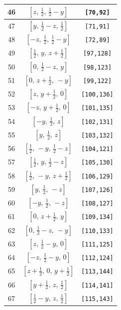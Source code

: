 \documentclass[fleqn,8pt]{jsarticle}
\begin{document}
\begin{longtable}{ccc}
46 & $\left[ z,\, \frac{1}{2},\, \frac{1}{2} - y \right]$ & {\tt [70,92]} \\ \hline
47 & $\left[ y,\, \frac{1}{2} - z,\, \frac{1}{2} \right]$ & {\tt [71,91]} \\ \hline
48 & $\left[ - z,\, \frac{1}{2},\, \frac{1}{2} - y \right]$ & {\tt [72,89]} \\ \hline
49 & $\left[ \frac{1}{2},\, y,\, z + \frac{1}{2} \right]$ & {\tt [97,128]} \\ \hline
50 & $\left[ 0,\, \frac{1}{2} - z,\, y \right]$ & {\tt [98,123]} \\ \hline
51 & $\left[ 0,\, z + \frac{1}{2},\, - y \right]$ & {\tt [99,122]} \\ \hline
52 & $\left[ z,\, y + \frac{1}{2},\, 0 \right]$ & {\tt [100,136]} \\ \hline
53 & $\left[ - z,\, y + \frac{1}{2},\, 0 \right]$ & {\tt [101,135]} \\ \hline
54 & $\left[ - y,\, \frac{1}{2},\, z \right]$ & {\tt [102,131]} \\ \hline
55 & $\left[ y,\, \frac{1}{2},\, z \right]$ & {\tt [103,132]} \\ \hline
56 & $\left[ \frac{1}{2},\, - y,\, \frac{1}{2} - z \right]$ & {\tt [104,121]} \\ \hline
57 & $\left[ \frac{1}{2},\, y,\, \frac{1}{2} - z \right]$ & {\tt [105,130]} \\ \hline
58 & $\left[ \frac{1}{2},\, - y,\, z + \frac{1}{2} \right]$ & {\tt [106,129]} \\ \hline
59 & $\left[ y,\, \frac{1}{2},\, - z \right]$ & {\tt [107,126]} \\ \hline
60 & $\left[ - y,\, \frac{1}{2},\, - z \right]$ & {\tt [108,127]} \\ \hline
61 & $\left[ 0,\, z + \frac{1}{2},\, y \right]$ & {\tt [109,134]} \\ \hline
62 & $\left[ 0,\, \frac{1}{2} - z,\, - y \right]$ & {\tt [110,133]} \\ \hline
63 & $\left[ z,\, \frac{1}{2} - y,\, 0 \right]$ & {\tt [111,125]} \\ \hline
64 & $\left[ - z,\, \frac{1}{2} - y,\, 0 \right]$ & {\tt [112,124]} \\ \hline
65 & $\left[ z + \frac{1}{2},\, 0,\, y + \frac{1}{2} \right]$ & {\tt [113,144]} \\ \hline
66 & $\left[ y + \frac{1}{2},\, z,\, \frac{1}{2} \right]$ & {\tt [114,141]} \\ \hline
67 & $\left[ \frac{1}{2} - y,\, z,\, \frac{1}{2} \right]$ & {\tt [115,143]} \\ \hline

\end{longtable}
\end{document}
